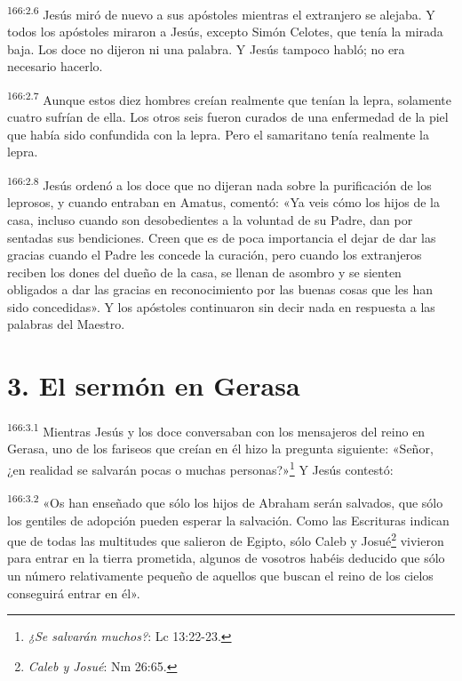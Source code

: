 \par
\textsuperscript{166:2.6} Jesús miró de nuevo a sus apóstoles mientras el extranjero se alejaba. Y todos los apóstoles miraron a Jesús, excepto Simón Celotes, que tenía la mirada baja. Los doce no dijeron ni una palabra. Y Jesús tampoco habló; no era necesario hacerlo.

\par
\textsuperscript{166:2.7} Aunque estos diez hombres creían realmente que tenían la lepra, solamente cuatro sufrían de ella. Los otros seis fueron curados de una enfermedad de la piel que había sido confundida con la lepra. Pero el samaritano tenía realmente la lepra.

\par
\textsuperscript{166:2.8} Jesús ordenó a los doce que no dijeran nada sobre la purificación de los leprosos, y cuando entraban en Amatus, comentó: «Ya veis cómo los hijos de la casa, incluso cuando son desobedientes a la voluntad de su Padre, dan por sentadas sus bendiciones. Creen que es de poca importancia el dejar de dar las gracias cuando el Padre les concede la curación, pero cuando los extranjeros reciben los dones del dueño de la casa, se llenan de asombro y se sienten obligados a dar las gracias en reconocimiento por las buenas cosas que les han sido concedidas». Y los apóstoles continuaron sin decir nada en respuesta a las palabras del Maestro.

\section*{3. El sermón en Gerasa}
\par
\textsuperscript{166:3.1} Mientras Jesús y los doce conversaban con los mensajeros del reino en Gerasa, uno de los fariseos que creían en él hizo la pregunta siguiente: «Señor, ¿en realidad se salvarán pocas o muchas personas?»\footnote{\textit{¿Se salvarán muchos?}: Lc 13:22-23.} Y Jesús contestó:

\par
\textsuperscript{166:3.2} «Os han enseñado que sólo los hijos de Abraham serán salvados, que sólo los gentiles de adopción pueden esperar la salvación. Como las Escrituras indican que de todas las multitudes que salieron de Egipto, sólo Caleb y Josué\footnote{\textit{Caleb y Josué}: Nm 26:65.} vivieron para entrar en la tierra prometida, algunos de vosotros habéis deducido que sólo un número relativamente pequeño de aquellos que buscan el reino de los cielos conseguirá entrar en él».

